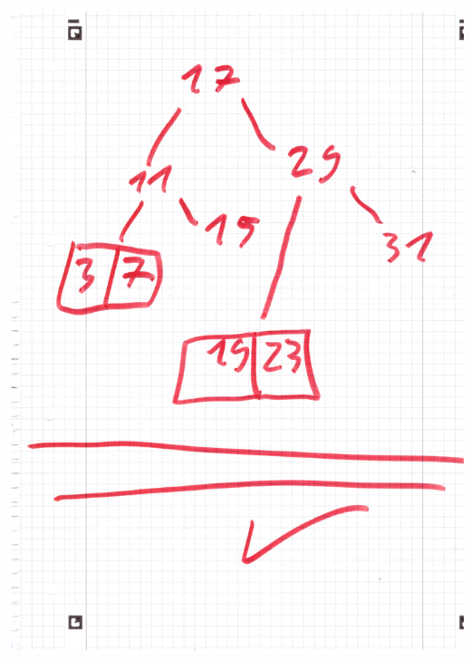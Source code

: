\documentclass{article}
\begin{document}
	\includegraphics[width=\linewidth]{A10102}
\end{document}
